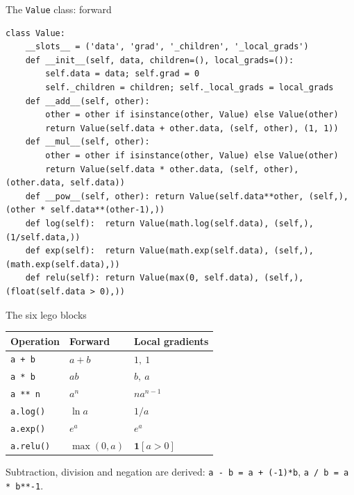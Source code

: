 \documentclass[aspectratio=169,11pt]{beamer}
\begin{document}
\begin{frame}[fragile]{The \texttt{Value} class: forward}
\begin{lstlisting}
class Value:
    __slots__ = ('data', 'grad', '_children', '_local_grads')
    def __init__(self, data, children=(), local_grads=()):
        self.data = data; self.grad = 0
        self._children = children; self._local_grads = local_grads
    def __add__(self, other):
        other = other if isinstance(other, Value) else Value(other)
        return Value(self.data + other.data, (self, other), (1, 1))
    def __mul__(self, other):
        other = other if isinstance(other, Value) else Value(other)
        return Value(self.data * other.data, (self, other), (other.data, self.data))
    def __pow__(self, other): return Value(self.data**other, (self,), (other * self.data**(other-1),))
    def log(self):  return Value(math.log(self.data), (self,), (1/self.data,))
    def exp(self):  return Value(math.exp(self.data), (self,), (math.exp(self.data),))
    def relu(self): return Value(max(0, self.data), (self,), (float(self.data > 0),))
\end{lstlisting}
\end{frame}

\begin{frame}{The six lego blocks}
\centering
\begin{tabular}{@{}lll@{}}
\toprule
Operation & Forward & Local gradients \\
\midrule
\texttt{a + b} & $a+b$ & $1,\ 1$ \\
\texttt{a * b} & $ab$ & $b,\ a$ \\
\texttt{a ** n} & $a^n$ & $n a^{n-1}$ \\
\texttt{a.log()} & $\ln a$ & $1/a$ \\
\texttt{a.exp()} & $e^a$ & $e^a$ \\
\texttt{a.relu()} & $\max(0,a)$ & $\mathbf 1[a>0]$ \\
\bottomrule
\end{tabular}
\vfill
Subtraction, division and negation are derived: \texttt{a - b = a + (-1)*b}, \texttt{a / b = a * b**-1}.
\end{frame}
\end{document}
